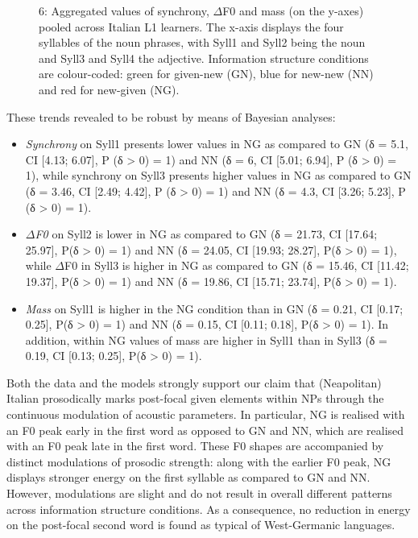   
 

\begin{stylecaption}\begin{figure}
\caption{6: Aggregated values of synchrony, ${\Delta}$F0 and mass (on the y-axes) pooled across Italian L1 learners. The x-axis displays the four syllables of the noun phrases, with Syll1 and Syll2 being the noun and Syll3 and Syll4 the adjective. Information structure conditions are colour-coded: green for given-new (GN), blue for new-new (NN) and red for new-given (NG).} 
\label{fig:key:2}
\end{figure}\end{stylecaption}

These trends revealed to be robust by means of Bayesian analyses:

\begin{itemize}
\item \textit{Synchrony} on Syll1 presents lower values in NG as compared to GN (δ = 5.1, CI [4.13; 6.07], P (δ > 0) = 1) and NN (δ = 6, CI [5.01; 6.94], P (δ > 0) = 1), while synchrony on Syll3 presents higher values in NG as compared to GN (δ = 3.46, CI [2.49; 4.42], P (δ > 0) = 1) and NN (δ = 4.3, CI [3.26; 5.23], P (δ > 0) = 1).
\item \textit{${\Delta}$F0} on Syll2 is lower in NG as compared to GN (δ = 21.73, CI [17.64; 25.97], P(δ > 0) = 1) and NN (δ = 24.05, CI [19.93; 28.27], P(δ > 0) = 1), while ${\Delta}$F0 in Syll3 is higher in NG as compared to GN (δ = 15.46, CI [11.42; 19.37], P(δ > 0) = 1) and NN (δ = 19.86, CI [15.71; 23.74], P(δ > 0) = 1).
\item \textit{Mass} on Syll1 is higher in the NG condition than in GN (δ = 0.21, CI [0.17; 0.25], P(δ > 0) = 1) and NN (δ = 0.15, CI [0.11; 0.18], P(δ > 0) = 1). In addition, within NG values of mass are higher in Syll1 than in Syll3 (δ = 0.19, CI [0.13; 0.25], P(δ > 0) = 1).
\end{itemize}

Both the data and the models strongly support our claim that (Neapolitan) Italian prosodically marks post-focal given elements within NPs through the continuous modulation of acoustic parameters. In particular, NG is realised with an F0 peak early in the first word as opposed to GN and NN, which are realised with an F0 peak late in the first word. These F0 shapes are accompanied by distinct modulations of prosodic strength: along with the earlier F0 peak, NG displays stronger energy on the first syllable as compared to GN and NN. However, modulations are slight and do not result in overall different patterns across information structure conditions. As a consequence, no reduction in energy on the post-focal second word is found as typical of West-Germanic languages. 

